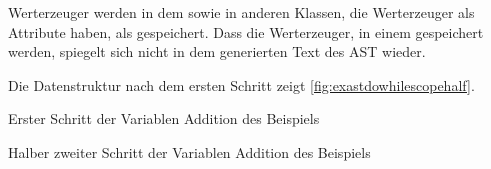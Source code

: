 {{        Werterzeuger werden in dem  sowie in anderen Klassen, die Werterzeuger als Attribute haben, als  gespeichert. Dass die Werterzeuger, in einem  gespeichert werden, spiegelt sich nicht in dem generierten Text des AST wieder.

        Die Datenstruktur nach dem ersten Schritt zeigt \autoref{fig:exastdowhilescopehalf}.
        \begin{paracol}{2}
          \begin{myCodeEnv}
            \centering
            \begin{myInvBox}[width=.9\linewidth]
              
            \end{myInvBox}
            \caption{Erster Schritt der Variablen Addition des Beispiels}
            \label{fig:exastdowhilescopehalf}
          \end{myCodeEnv}
          \switchcolumn
          \begin{myCodeEnv}
            \centering
            \begin{myInvBox}[width=.9\linewidth]
              
            \end{myInvBox}
            \caption{Halber zweiter Schritt der Variablen Addition des Beispiels}
            \label{fig:exastdowhilescopehalftwo}
          \end{myCodeEnv}
        \end{paracol}

}}
